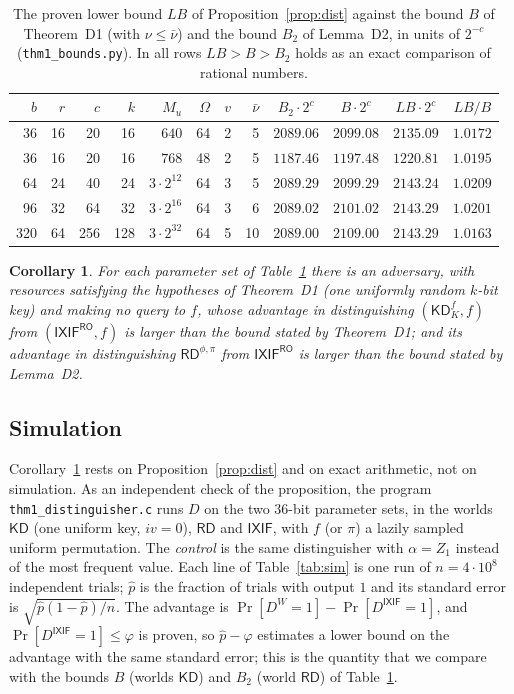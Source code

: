 \documentclass[11pt,a4paper]{article}
\newtheorem{corollary}{Corollary}
\theoremstyle{definition}
\theoremstyle{remark}
\newcommand{\KD}{\mathsf{KD}}
\newcommand{\RD}{\mathsf{RD}}
\newcommand{\IXIF}{\mathsf{IXIF}}
\newcommand{\RO}{\mathsf{RO}}
\newcommand{\file}[1]{\texttt{#1}}
\begin{document}
\begin{table}[ht]
\centering
\caption{The proven lower bound $\mathit{LB}$ of Proposition~\ref{prop:dist} against the bound $B$ of Theorem~D1
(with $\nu \le \bar\nu$) and the bound $B_2$ of Lemma~D2, in units of $2^{-c}$ (\file{thm1\_bounds.py}). In all rows
$\mathit{LB} > B > B_2$ holds as an exact comparison of rational numbers.}\label{tab:inst}
\smallskip
\begin{tabular}{rrrrrrrrcccc}
\toprule
$b$ & $r$ & $c$ & $k$ & $M_u$ & $\Omega$ & $v$ & $\bar\nu$ & $B_2\cdot2^c$ & $B\cdot2^c$ & $\mathit{LB}\cdot2^c$ & $\mathit{LB}/B$ \\
\midrule
 36 & 16 &  20 &  16 & $640$ & 64 & 2 & 5 & $2089.06$ & $2099.08$ & $2135.09$ & $1.0172$ \\
 36 & 16 &  20 &  16 & $768$ & 48 & 2 & 5 & $1187.46$ & $1197.48$ & $1220.81$ & $1.0195$ \\
 64 & 24 &  40 &  24 & $3\cdot2^{12}$ & 64 & 3 & 5 & $2089.29$ & $2099.29$ & $2143.24$ & $1.0209$ \\
 96 & 32 &  64 &  32 & $3\cdot2^{16}$ & 64 & 3 & 6 & $2089.02$ & $2101.02$ & $2143.29$ & $1.0201$ \\
320 & 64 & 256 & 128 & $3\cdot2^{32}$ & 64 & 5 & 10 & $2089.00$ & $2109.00$ & $2143.29$ & $1.0163$ \\
\bottomrule
\end{tabular}
\end{table}

\begin{corollary}\label{cor:false}
For each parameter set of Table~\ref{tab:inst} there is an adversary, with resources satisfying the hypotheses of
Theorem~D1 (one uniformly random $k$-bit key) and making no query to $f$, whose advantage in distinguishing $(\KD^f_K, f)$ from $(\IXIF^{\RO}, f)$ is
larger than the bound stated by Theorem~D1; and its advantage in distinguishing $\RD^{\phi,\pi}$ from $\IXIF^{\RO}$
is larger than the bound stated by Lemma~D2.
\end{corollary}

\subsection{Simulation}\label{sec:sim}
Corollary~\ref{cor:false} rests on Proposition~\ref{prop:dist} and on exact arithmetic, not on simulation. As an
independent check of the proposition, the program \file{thm1\_distinguisher.c} runs $D$ on the two $36$-bit parameter sets,
in the worlds $\KD$ (one uniform key, $iv = 0$), $\RD$ and $\IXIF$, with $f$ (or $\pi$) a lazily sampled uniform permutation.
The \emph{control} is the same distinguisher with $\alpha = Z_1$ instead of the most frequent value. Each line of
Table~\ref{tab:sim} is one run of $n = 4 \cdot 10^8$ independent trials; $\hat p$ is the fraction of trials with output $1$ and
its standard error is $\sqrt{\hat p(1-\hat p)/n}$. The advantage is $\Pr[D^W = 1] - \Pr[D^{\IXIF} = 1]$, and
$\Pr[D^{\IXIF} = 1] \le \varphi$ is proven, so $\hat p - \varphi$ estimates a lower bound on the advantage with the same standard
error; this is the quantity that we compare with the bounds $B$ (worlds $\KD$) and $B_2$ (world $\RD$) of Table~\ref{tab:inst}.
\end{document}
